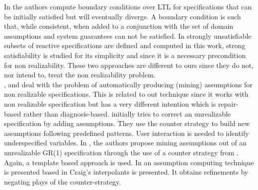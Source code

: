 In \cite{DBLP:conf/kbse/DegiovanniRACA16} the authors compute boundary conditions over LTL for specifications that can be initially satisfied but will eventually diverge.  A boundary condition is such that, while consistent, when added to a conjunction with the set of domain assumptions and system guarantees can not be satisfied.
In \cite{DBLP:conf/kbse/HagiharaESY14} strongly
unsatisfiable subsets of reactive specifications are defined and computed in this work, strong satisfiability is studied for its simplicity and since it is a necessary precondition for non realizability. These two approaches are different to ours since they do not, nor intend to, treat the non realizability problem.\\
\cite{DBLP:conf/fmcad/AlurMT13}, \cite{DBLP:conf/memocode/LiDS11} and
\cite{DBLP:conf/tacas/CavezzaA17} deal with the problem of automatically producing 
(mining) assumptions for non realizable specifications.  This is related to out technique since it works with non realizable specification
but has a very different intention which is  repair-based rather than diagnosis-based.
\cite{DBLP:conf/fmcad/AlurMT13} initially tries to correct an unrealizable specification by adding assumptions.  They use the counter strategy to build new assumptions following predefined patterns.  User interaction is needed to identify underspecified variables.
In \cite{DBLP:conf/memocode/LiDS11}, the authors propose mining assumptions out of an unrealizable GR(1) specification through the use of a counter strategy from \cite{DBLP:conf/hvc/KonighoferHB10}. Again, a template based approach is used.
In \cite{DBLP:conf/tacas/CavezzaA17} an assumption computing technique is presented based in Craig's interpolants is presented.  It obtains refinements by negating plays of the counter-strategy.\\



